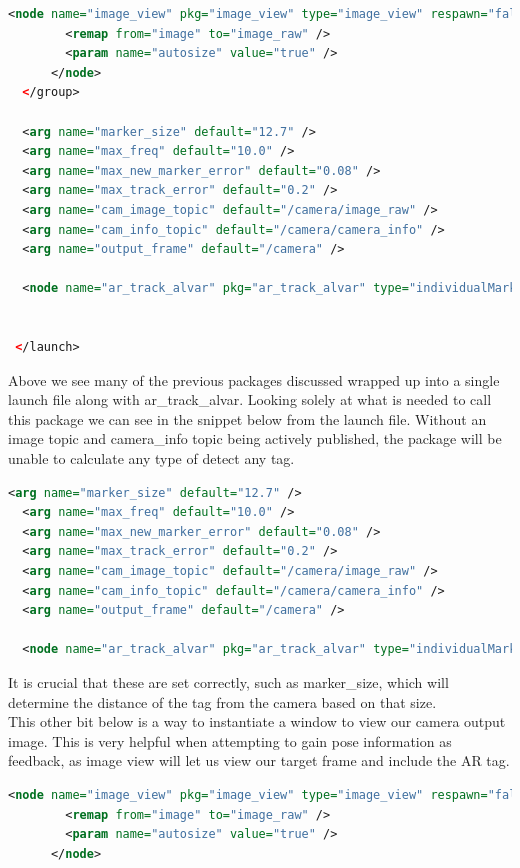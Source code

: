 \begin{itemize}
\begin{lstlisting}[language=xml]
      <node name="image_view" pkg="image_view" type="image_view" respawn="false" output="screen">
        <remap from="image" to="image_raw" />
        <param name="autosize" value="true" />
      </node>
  </group>
 
  <arg name="marker_size" default="12.7" />
  <arg name="max_freq" default="10.0" />
  <arg name="max_new_marker_error" default="0.08" />
  <arg name="max_track_error" default="0.2" />
  <arg name="cam_image_topic" default="/camera/image_raw" />
  <arg name="cam_info_topic" default="/camera/camera_info" /> 
  <arg name="output_frame" default="/camera" />
   
  <node name="ar_track_alvar" pkg="ar_track_alvar" type="individualMarkersNoKinect" respawn="false" output="screen" args="$(arg marker_size) $(arg max_new_marker_error) $(arg max_track_error) $(arg cam_image_topic) $(arg cam_info_topic) $(arg output_frame) 30" />
  

 </launch>
\end{lstlisting}
Above we see many of the previous packages discussed wrapped up into a single launch file along with ar\_track\_alvar. Looking solely at what is needed to call this package we can see in the snippet below from the launch file. Without an image topic and camera\_info topic being actively published, the package will be unable to calculate any type of detect any tag. 

\begin{lstlisting}[language=xml]
  <arg name="marker_size" default="12.7" />
  <arg name="max_freq" default="10.0" />
  <arg name="max_new_marker_error" default="0.08" />
  <arg name="max_track_error" default="0.2" />
  <arg name="cam_image_topic" default="/camera/image_raw" />
  <arg name="cam_info_topic" default="/camera/camera_info" /> 
  <arg name="output_frame" default="/camera" />
   
  <node name="ar_track_alvar" pkg="ar_track_alvar" type="individualMarkersNoKinect" respawn="false" output="screen" args="$(arg marker_size) $(arg max_new_marker_error) $(arg max_track_error) $(arg cam_image_topic) $(arg cam_info_topic) $(arg output_frame) 30" />
\end{lstlisting}
It is crucial that these are set correctly, such as marker\_size, which will determine the distance of the tag from the camera based on that size.\\

This other bit below is a way to instantiate a window to view our camera output image. This is very helpful when attempting to gain pose information as feedback, as image view will let us view our target frame and include the AR tag.
\begin{lstlisting}[language=xml]
      <node name="image_view" pkg="image_view" type="image_view" respawn="false" output="screen">
        <remap from="image" to="image_raw" />
        <param name="autosize" value="true" />
      </node>
\end{lstlisting}


\end{itemize}
